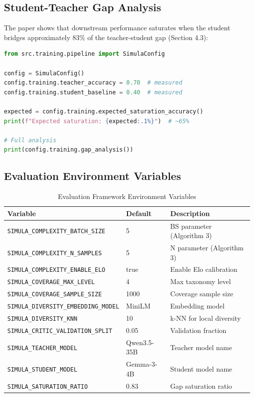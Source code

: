 \documentclass[11pt,a4paper]{article}
\begin{document}
\subsection{Student-Teacher Gap Analysis}

The paper shows that downstream performance saturates when the student bridges
approximately 83\% of the teacher-student gap (Section 4.3):

\begin{lstlisting}[language=Python,caption={Gap analysis}]
from src.training.pipeline import SimulaConfig

config = SimulaConfig()
config.training.teacher_accuracy = 0.70  # measured
config.training.student_baseline = 0.40  # measured

expected = config.training.expected_saturation_accuracy()
print(f"Expected saturation: {expected:.1%}")  # ~65%

# Full analysis
print(config.training.gap_analysis())
\end{lstlisting}

\subsection{Evaluation Environment Variables}

\begin{table}[H]
\centering
\caption{Evaluation Framework Environment Variables}
\label{tab:eval-env}
\begin{tabularx}{\textwidth}{lp{2cm}X}
\toprule
\textbf{Variable} & \textbf{Default} & \textbf{Description} \\
\midrule
\texttt{SIMULA\_COMPLEXITY\_BATCH\_SIZE} & 5 & BS parameter (Algorithm 3) \\
\texttt{SIMULA\_COMPLEXITY\_N\_SAMPLES} & 5 & N parameter (Algorithm 3) \\
\texttt{SIMULA\_COMPLEXITY\_ENABLE\_ELO} & true & Enable Elo calibration \\
\texttt{SIMULA\_COVERAGE\_MAX\_LEVEL} & 4 & Max taxonomy level \\
\texttt{SIMULA\_COVERAGE\_SAMPLE\_SIZE} & 1000 & Coverage sample size \\
\texttt{SIMULA\_DIVERSITY\_EMBEDDING\_MODEL} & MiniLM & Embedding model \\
\texttt{SIMULA\_DIVERSITY\_KNN} & 10 & k-NN for local diversity \\
\texttt{SIMULA\_CRITIC\_VALIDATION\_SPLIT} & 0.05 & Validation fraction \\
\texttt{SIMULA\_TEACHER\_MODEL} & Qwen3.5-35B & Teacher model name \\
\texttt{SIMULA\_STUDENT\_MODEL} & Gemma-3-4B & Student model name \\
\texttt{SIMULA\_SATURATION\_RATIO} & 0.83 & Gap saturation ratio \\
\bottomrule
\end{tabularx}
\end{table}
\end{document}
